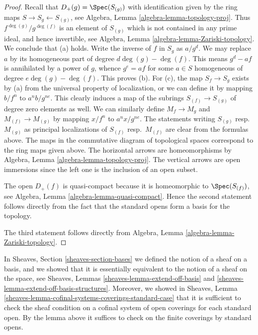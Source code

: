\begin{proof}
Recall that $D_{+}(g) = \Spec(S_{(g)})$ with identification
given by the ring maps $S \to S_g \leftarrow S_{(g)}$, see
Algebra, Lemma \ref{algebra-lemma-topology-proj}.
Thus $f^{\deg(g)}/g^{\deg(f)}$ is an element of $S_{(g)}$ which is not
contained in any prime ideal, and hence invertible,
see Algebra, Lemma \ref{algebra-lemma-Zariski-topology}.
We conclude that (a) holds.
Write the inverse of $f$ in $S_g$ as $a/g^d$.
We may replace $a$ by its homogeneous part of degree $d\deg(g) - \deg(f)$.
This means $g^d - af$ is annihilated by a power of $g$, whence
$g^e = af$ for some $a \in S$ homogeneous of degree $e\deg(g) - \deg(f)$.
This proves (b).
For (c), the map $S_f \to S_g$ exists by (a) from the universal property
of localization, or we can define it by mapping $b/f^n$
to $a^nb/g^{ne}$. This clearly induces a map of the subrings
$S_{(f)} \to S_{(g)}$ of degree zero elements as well.
We can similarly define $M_f \to M_g$ and $M_{(f)} \to M_{(g)}$ by mapping
$x/f^n$ to $a^nx/g^{ne}$. The statements writing $S_{(g)}$
resp.\ $M_{(g)}$ as principal localizations of $S_{(f)}$ resp.\ $M_{(f)}$
are clear from the formulas above. The maps in the commutative diagram
of topological spaces correspond to the ring maps given above. The
horizontal arrows are homeomorphisms by
Algebra, Lemma \ref{algebra-lemma-topology-proj}.
The vertical arrows are open immersions since the left
one is the inclusion of an open subset.

\medskip\noindent
The open $D_{+}(f)$ is quasi-compact because it is homeomorphic
to $\Spec(S_{(f)})$, see  Algebra, Lemma \ref{algebra-lemma-quasi-compact}.
Hence the second statement follows directly
from the fact that the standard opens form
a basis for the topology.

\medskip\noindent
The third statement follows directly from
Algebra, Lemma \ref{algebra-lemma-Zariski-topology}.
\end{proof}

In Sheaves, Section \ref{sheaves-section-bases} we defined
the notion of a sheaf on a basis, and we showed that it is
essentially equivalent to the notion of a sheaf on the space,
see Sheaves, Lemmas \ref{sheaves-lemma-extend-off-basis} and
\ref{sheaves-lemma-extend-off-basis-structures}. Moreover,
we showed in
Sheaves, Lemma \ref{sheaves-lemma-cofinal-systems-coverings-standard-case}
that it is sufficient to check the sheaf
condition on a cofinal system of open coverings for each
standard open. By the lemma above it suffices to check
on the finite coverings by standard opens.

